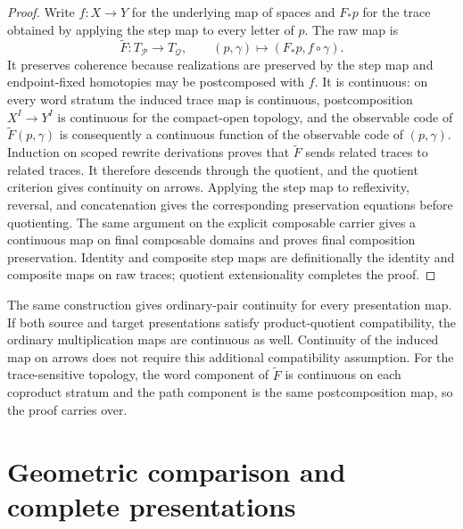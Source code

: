 \documentclass[10pt,reqno]{amsart}
\theoremstyle{definition}
\theoremstyle{plain}
\theoremstyle{remark}
\begin{document}
\begin{proof}
Write $f:X\to Y$ for the underlying map of spaces and $F_*p$ for the trace
obtained by applying the step map to every letter of $p$.  The raw map is
\[
  \widetilde F:T_{\mathcal P}\longrightarrow T_{\mathcal Q},
  \qquad (p,\gamma)\longmapsto(F_*p,f\circ\gamma).
\]
It preserves coherence because realizations are preserved by the step map and
endpoint-fixed homotopies may be postcomposed with $f$.  It is continuous:
on every word stratum the induced trace map is continuous, postcomposition
$X^I\to Y^I$ is continuous for the compact-open topology, and the observable
code of $\widetilde F(p,\gamma)$ is consequently a continuous function of the
observable code of $(p,\gamma)$.  Induction on scoped rewrite derivations
proves that $\widetilde F$ sends related traces to related traces.  It therefore
descends through the quotient, and the quotient criterion gives continuity on
arrows.  Applying the step map to reflexivity, reversal, and concatenation
gives the corresponding preservation equations before quotienting.
The same argument on the explicit composable carrier gives a continuous map on
final composable domains and proves final composition preservation.  Identity
and composite step maps are definitionally the identity and composite maps on
raw traces; quotient extensionality completes the proof.
\end{proof}

The same construction gives ordinary-pair continuity for every presentation
map.  If both source and target presentations satisfy product-quotient
compatibility, the ordinary multiplication maps are continuous as well.  Continuity of the induced map on arrows does not require this
additional compatibility assumption.  For the trace-sensitive topology, the
word component of $\widetilde F$ is continuous on each coproduct stratum and
the path component is the same postcomposition map, so the proof carries
over.

\section{Geometric comparison and complete presentations}
\label{sec:comparison}
\end{document}
